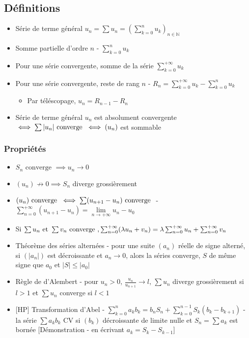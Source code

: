 \documentclass[openany]{book}
\begin{document}
\subsection{Définitions}
\begin{itemize}
    \item Série de terme général $u_n = \sum u_n = \left( \sum_{k=0}^{n}u_k \right)_{n \in \mathbb{N}}$
    \item Somme partielle d'ordre $n$ - $\sum_{k=0}^{n}u_k$
    \item Pour une série convergente, somme de la série $\sum_{k=0}^{+\infty} u_k$
    \item Pour une série convergente, reste de rang $n$ - $R_n = \sum_{k=0}^{+\infty} u_k - \sum_{k=0}^{n} u_k$
    \begin{itemize}
        \item Par téléscopage, $u_n = R_{n-1} - R_n$
    \end{itemize}
    \item Série de terme général $u_n$ est absolument convergente $\iff \sum |u_n| \text{ converge } \iff (u_n)$ est sommable
\end{itemize}

\subsubsection{Propriétés}
\begin{itemize}
    \item $S_n \text{ converge } \implies u_n \longrightarrow 0$
    \item $(u_n) \not \longrightarrow 0 \implies S_n$ diverge grossièrement
    \item $ (u_n) \text{ converge } \iff \sum (u_{n+1} - u_n) \text{ converge } $ - $\sum_{n=0}^{+\infty} (u_{n+1} - u_n) = \underset{n \rightarrow + \infty}{\lim} u_n - u_0$
    \item Si $\sum u_n \text{ et } \sum v_n \text{ converge }, \sum_{n=0}^{+\infty} (\lambda u_n + v_n) = \lambda \sum_{n=0}^{+\infty} u_n + \sum_{n=0}^{+\infty} v_n $
    \item Théorème des séries alternées - pour une suite $(a_n)$ réelle de signe alterné, si $(|a_n|)$ est décroissante et $a_n \longrightarrow 0$, alors la séries converge, $S$ de même signe que $a_0$ et $|S| \leq |a_0|$
    \item Règle de d'Alembert - pour $u_n > 0$, $\frac{u_n}{u_{n+1}} \longrightarrow l$, $\sum u_n$ diverge grossièrement si $l > 1$ et $\sum u_n$ converge si $l < 1$
    \item{} [HP] Transformation d'Abel - $\sum_{k=0}^{n} a_k b_k = b_n S_n + \sum_{k=0}^{n-1} S_k(b_k - b_{k+1})$ - la série $\sum a_k b_k$ CV si $(b_k)$ décroissante de limite nulle et $S_n = \sum a_k$ est bornée [Démonstration - en écrivant $a_k = S_k - S_{k-1}$]
\end{itemize}
\end{document}
